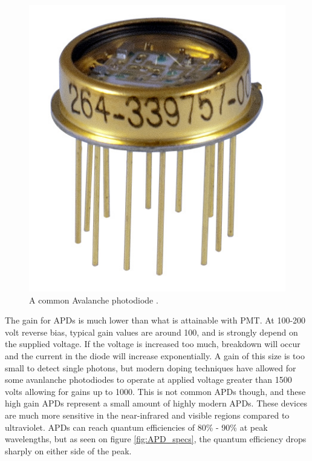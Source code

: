 \begin{figure}[htb]
\begin{center}
\includegraphics[scale=0.6]{figures/RCS/APD}
\caption{A common Avalanche photodiode \cite{APD_pic}.}
\label{fig:APD}
\end{center}
\end{figure}

The gain for APDs is much lower than what is attainable with PMT. At 100-200 volt reverse bias, typical gain values are around 100, and is strongly depend on the supplied voltage.  If the voltage is increased too much, breakdown will occur and the current in the diode will increase exponentially. A gain of this size is too small to detect single photons, but modern doping techniques have allowed for some avanlanche photodiodes to operate at applied voltage greater than 1500 volts allowing for gains up to 1000. This is not common APDs though, and these high gain APDs represent a small amount of highly modern APDs. These devices are much more sensitive in the near-infrared and visible regions compared to ultraviolet. APDs can reach quantum efficiencies of 80\% - 90\% at peak wavelengths, but as seen on figure \ref{fig:APD_specs}, the quantum efficiency drops sharply on either side of the peak.

